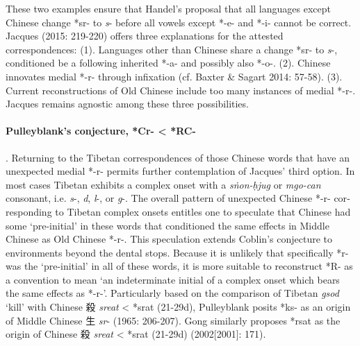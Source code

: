 These two examples ensure that Handel's proposal that all languages
except Chinese change *sr- to \emph{s}- before all vowels except *-e-
and *-i- cannot be correct. Jacques (2015: 219-220) offers three
explanations for the attested correspondences: (1). Languages other than
Chinese share a change *sr- to \emph{s}-, conditioned be a following
inherited *-a- and possibly also *-o-. (2). Chinese innovates medial
*-r- through infixation (cf. Baxter \& Sagart 2014: 57-58). (3). Current
re­con­structions of Old Chinese include too many instances of medial
*-r-. Jacques remains agnostic among these three possibilities.

\paragraph{Pulleyblank's conjecture, *Cr- \textless{} *RC-}.
Returning to the Tibetan correspondences of those Chinese words that
have an unexpected medial *-r- permits further contemplation of Jacques'
third option. In most cases Tibetan exhibits a complex onset with a {} \emph{sṅon-ḥjug} or {} \emph{mgo-can} consonant, i.e.
 \emph{s}-,  \emph{d},  \emph{l}-, or \emph{g}-. The overall pattern of
unexpected Chinese *-r- cor­re­sponding to Tibetan complex onsets
entitles one to speculate that Chinese had some `pre-initial' in these
words that conditioned the same effects in Middle Chinese as Old Chinese
*-r-. This speculation extends Coblin's conjecture to environments
beyond the dental stops. Because it is unlikely that specifically *r-
was the `pre-initial' in all of these words, it is more suitable to
reconstruct *R- as a convention to mean `an indeterminate initial of a
complex onset which bears the same effects as *-r-'. Particularly based
on the comparison of Tibetan {} \emph{gsod} `kill' with Chinese 殺
 \emph{sreat} \textless{} *srat (21-29d), Pulleyblank posits *ks- as an
origin of Middle Chinese 生 \emph{sr}- (1965: 206-207). Gong similarly
proposes *rsat as the origin of Chinese 殺 \emph{sreat} \textless{}
*srat (21-29d) (2002{[}2001]: 171).

